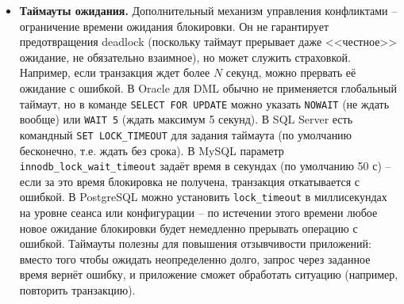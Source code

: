 \begin{itemize}
   Проверка – достаточно затратная операция, поэтому её делают не при каждом ожидании, а только по истечении таймаута в расчете на то, что краткосрочные конфликты завершатся сами \autocite{PostgreSQLdocc19}. Если обнаружен цикл, система выберет <<жертву>> – одну из транзакций в цикле – и принудительно откатит её, устраняя взаимоблокировку. Как правило, выбирают транзакцию, которая принесёт наименьшие потери: например, в SQL Server детектор просчитывает <<стоимость>> отката (по количеству изменённых строк, журнальных записей) и жертвой делает самую <<лёгкую>> транзакцию, возвращая ей ошибку <<deadlock victim>>. В PostgreSQL по умолчанию жертвой станет та транзакция, которая первым заметила deadlock (или случайная из цикла) – она получит ошибку \texttt{ERROR: deadlock detected}, а ее изменения откатятся. Oracle аналогично при обнаружении цикла сразу откатывает одну из транзакций (с меньшим \texttt{SID}, по документам) с ошибкой ORA-00060 (deadlock detected). MySQL InnoDB также проводит мгновенную детекцию: когда транзакция вынуждена ждать, движок просматривает граф зависимостей; если обнаруживается цикл, одна из участвующих транзакций откатывается (ей возвращается ошибка <<Deadlock found>>), а другая получает ресурс. Во всех случаях освобождение блокировок жертвой позволяет остальным продолжить работу. \item \textbf{Таймауты ожидания.} Дополнительный механизм управления конфликтами – ограничение времени ожидания блокировки. Он не гарантирует предотвращения deadlock (поскольку таймаут прерывает даже <<честное>> ожидание, не обязательно взаимное), но может служить страховкой. Например, если транзакция ждет более $N$ секунд, можно прервать её ожидание с ошибкой. В Oracle для DML обычно не применяется глобальный таймаут, но в команде \texttt{SELECT FOR UPDATE} можно указать \texttt{NOWAIT} (не ждать вообще) или \texttt{WAIT 5} (ждать максимум 5 секунд). В SQL Server есть командный \texttt{SET LOCK\_TIMEOUT} для задания таймаута (по умолчанию бесконечно, т.е. ждать без срока). В MySQL параметр \texttt{innodb\_lock\_wait\_timeout} задаёт время в секундах (по умолчанию 50 с) – если за это время блокировка не получена, транзакция откатывается с ошибкой. В PostgreSQL можно установить \texttt{lock\_timeout} в миллисекундах на уровне сеанса или конфигурации – по истечении этого времени любое новое ожидание блокировки будет немедленно прерывать операцию с ошибкой. Таймауты полезны для повышения отзывчивости приложений: вместо того чтобы ожидать неопределенно долго, запрос через заданное время вернёт ошибку, и приложение сможет обработать ситуацию (например, повторить транзакцию). 

\end{itemize}
